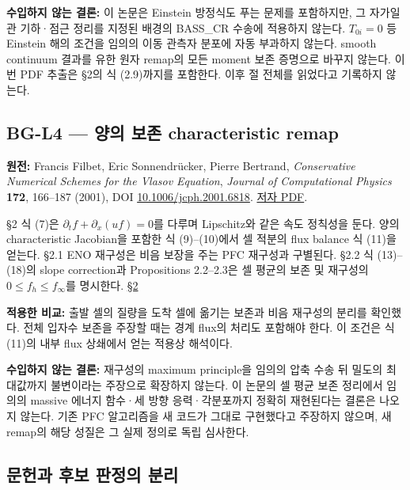 \documentclass[11pt,a4paper]{article}
\begin{document}
\textbf{수입하지 않는 결론:} 이 논문은 Einstein 방정식도 푸는 문제를 포함하지만, 그 자가일관 기하·점근 정리를 지정된 배경의 BASS\_CR 수송에 적용하지 않는다. \(T_{0i}=0\) 등 Einstein 해의 조건을 임의의 이동 관측자 분포에 자동 부과하지 않는다. smooth continuum 결과를 유한 원자 remap의 모든 moment 보존 증명으로 바꾸지 않는다. 이번 PDF 추출은 §2의 식 (2.9)까지를 포함한다. 이후 절 전체를 읽었다고 기록하지 않는다.

\hypertarget{bg-l4-uxc591uxc758-uxbcf4uxc874-characteristic-remap}{%
\subsection{BG-L4 --- 양의 보존 characteristic remap}\label{bg-l4-uxc591uxc758-uxbcf4uxc874-characteristic-remap}}

\textbf{원전:} Francis Filbet, Eric Sonnendrücker, Pierre Bertrand, \emph{Conservative Numerical Schemes for the Vlasov Equation}, \emph{Journal of Computational Physics} \textbf{172}, 166--187 (2001), DOI \href{https://doi.org/10.1006/jcph.2001.6818}{10.1006/jcph.2001.6818}. \href{https://www.math.univ-toulouse.fr/~ffilbet/Papers/paper03.pdf}{저자 PDF}.

§2 식 (7)은 \(\partial_t f+\partial_x(uf)=0\)를 다루며 Lipschitz와 같은 속도 정칙성을 둔다. 양의 characteristic Jacobian을 포함한 식 (9)--(10)에서 셀 적분의 flux balance 식 (11)을 얻는다. §2.1 ENO 재구성은 비음 보장을 주는 PFC 재구성과 구별된다. §2.2 식 (13)--(18)의 slope correction과 Propositions 2.2--2.3은 셀 평균의 보존 및 재구성의 \(0\le f_h\le f_\infty\)를 명시한다. \href{https://www.math.univ-toulouse.fr/~ffilbet/Papers/paper03.pdf}{§2}

\textbf{적용한 비교:} 출발 셀의 질량을 도착 셀에 옮기는 보존과 비음 재구성의 분리를 확인했다. 전체 입자수 보존을 주장할 때는 경계 flux의 처리도 포함해야 한다. 이 조건은 식 (11)의 내부 flux 상쇄에서 얻는 적용상 해석이다.

\textbf{수입하지 않는 결론:} 재구성의 maximum principle을 임의의 압축 수송 뒤 밀도의 최대값까지 불변이라는 주장으로 확장하지 않는다. 이 논문의 셀 평균 보존 정리에서 임의의 massive 에너지 함수·세 방향 응력·각분포까지 정확히 재현된다는 결론은 나오지 않는다. 기존 PFC 알고리즘을 새 코드가 그대로 구현했다고 주장하지 않으며, 새 remap의 해당 성질은 그 실제 정의로 독립 심사한다.

\hypertarget{uxbb38uxd5ccuxacfc-uxd6c4uxbcf4-uxd310uxc815uxc758-uxbd84uxb9ac}{%
\subsection{문헌과 후보 판정의 분리}\label{uxbb38uxd5ccuxacfc-uxd6c4uxbcf4-uxd310uxc815uxc758-uxbd84uxb9ac}}
\end{document}

